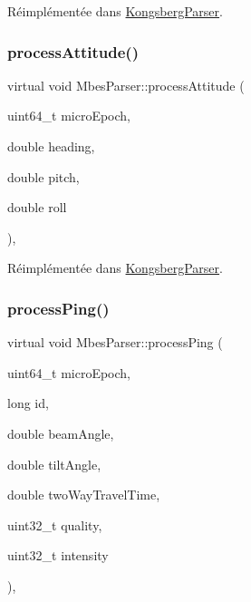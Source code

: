 Réimplémentée dans \hyperlink{classKongsbergParser_af7c31817a75fc4d153945f35f08b9d99}{Kongsberg\+Parser}.

\mbox{\label{classMbesParser_a347e78a8a1369c1ea6e63e7eea474b31}} 
\subsubsection{\texorpdfstring{process\+Attitude()}{processAttitude()}}
{\footnotesize\ttfamily virtual void Mbes\+Parser\+::process\+Attitude (\begin{DoxyParamCaption}\item[{uint64\+\_\+t}]{micro\+Epoch,  }\item[{double}]{heading,  }\item[{double}]{pitch,  }\item[{double}]{roll }\end{DoxyParamCaption})\hspace{0.3cm}{\ttfamily [inline]}, {\ttfamily [virtual]}}



Réimplémentée dans \hyperlink{classKongsbergParser_aa241961b762eb4fed4702a337573d46d}{Kongsberg\+Parser}.

\mbox{\label{classMbesParser_a9c099ea1003fff3c99991c37da1d40a6}} 
\subsubsection{\texorpdfstring{process\+Ping()}{processPing()}}
{\footnotesize\ttfamily virtual void Mbes\+Parser\+::process\+Ping (\begin{DoxyParamCaption}\item[{uint64\+\_\+t}]{micro\+Epoch,  }\item[{long}]{id,  }\item[{double}]{beam\+Angle,  }\item[{double}]{tilt\+Angle,  }\item[{double}]{two\+Way\+Travel\+Time,  }\item[{uint32\+\_\+t}]{quality,  }\item[{uint32\+\_\+t}]{intensity }\end{DoxyParamCaption})\hspace{0.3cm}{\ttfamily [inline]}, {\ttfamily [virtual]}}



